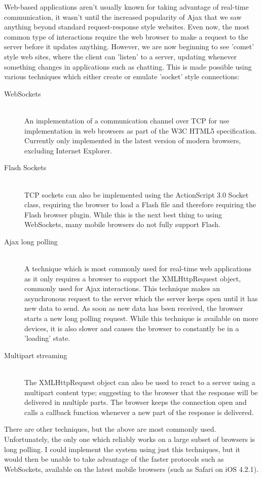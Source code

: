 \documentclass[a4papert,11pt,notitlepage]{ltxdoc}
\begin{document}
Web-based applications aren't usually known for taking advantage of real-time communication, it wasn't until the increased popularity of Ajax that we saw anything beyond standard request-response style websites. Even now, the most common type of interactions require the web browser to make a request to the server before it updates anything. However, we are now beginning to see 'comet'\cite{crane:comet} style web sites, where the client can 'listen' to a server, updating whenever something changes in applications such as chatting. This is made possible using various techniques which either create or emulate 'socket' style connections:
\begin{description}
\item[WebSockets] \hfill \\
An implementation of a communication channel over TCP for use implementation in web browsers as part of the W3C HTML5 specification. Currently only implemented in the latest version of modern browsers, excluding Internet Explorer.
\item[Flash Sockets] \hfill \\
TCP sockets can also be implemented using the ActionScript 3.0 Socket class, requiring the browser to load a Flash file and therefore requiring the Flash browser plugin. While this is the next best thing to using WebSockets, many mobile browsers do not fully support Flash.
\item[Ajax long polling] \hfill \\
A technique which is most commonly used for real-time web applications as it only requires a browser to support the XMLHttpRequest object, commonly used for Ajax interactions. This technique makes an asynchronous request to the server which the server keeps open until it has new data to send. As soon as new data has been received, the browser starts a new long polling request. While this technique is available on more devices, it is also slower and causes the browser to constantly be in a 'loading' state.
\item[Multipart streaming] \hfill \\
The XMLHttpRequest object can also be used to react to a server using a multipart content type; suggesting to the browser that the response will be delivered in multiple parts. The browser keeps the connection open and calls a callback function whenever a new part of the response is delivered.
\end{description}

There are other techniques, but the above are most commonly used. Unfortunately, the only one which reliably works on a large subset of browsers is long polling. I could implement the system using just this techniques, but it would then be unable to take advantage of the faster protocols such as WebSockets, available on the latest mobile browsers (such as Safari on iOS 4.2.1).
\end{document}
